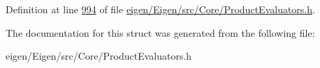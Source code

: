 Definition at line \hyperlink{eigen_2_eigen_2src_2_core_2_product_evaluators_8h_source_l00994}{994} of file \hyperlink{eigen_2_eigen_2src_2_core_2_product_evaluators_8h_source}{eigen/\+Eigen/src/\+Core/\+Product\+Evaluators.\+h}.



The documentation for this struct was generated from the following file\+:\begin{DoxyCompactItemize}
\item 
eigen/\+Eigen/src/\+Core/\+Product\+Evaluators.\+h\end{DoxyCompactItemize}
